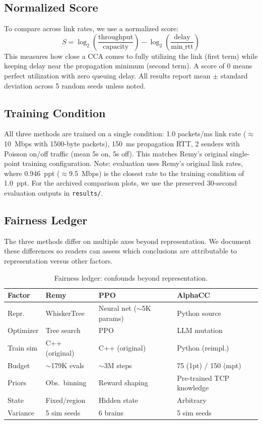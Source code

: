 \subsection{Normalized Score}

To compare across link rates, we use a normalized score:
\begin{equation}
S = \log_2\!\left(\frac{\text{throughput}}{\text{capacity}}\right) - \log_2\!\left(\frac{\text{delay}}{\text{min\_rtt}}\right)
\end{equation}
This measures how close a CCA comes to fully utilizing the link (first term)
while keeping delay near the propagation minimum (second term). A score of 0
means perfect utilization with zero queuing delay. All results report
mean $\pm$ standard deviation across 5 random seeds unless noted.

\subsection{Training Condition}

All three methods are trained on a single condition: 1.0 packets/ms link rate
(${\approx}$10~Mbps with 1500-byte packets), 150~ms propagation RTT, 2
senders with Poisson on/off traffic (mean 5s on, 5s off). This matches Remy's
original single-point training configuration. Note: evaluation uses Remy's
original link rates, where 0.946~ppt ($\approx$9.5~Mbps) is the closest
rate to the training condition of 1.0~ppt. For the archived comparison plots,
we use the preserved 30-second evaluation outputs in \texttt{results/}.

\subsection{Fairness Ledger}

The three methods differ on multiple axes beyond representation. We document
these differences so readers can assess which conclusions are attributable to
representation versus other factors.

\begin{table}[t]
\centering
\caption{Fairness ledger: confounds beyond representation.}
\label{tab:fairness}
\small
\begin{tabular}{@{}p{1.6cm}p{1.8cm}p{1.8cm}p{1.8cm}@{}}
\toprule
Factor & Remy & PPO & AlphaCC \\
\midrule
Repr.     & WhiskerTree & Neural net (${\sim}$5K params) & Python source \\
Optimizer & Tree search & PPO & LLM mutation \\
Train sim & C++ (original) & C++ (original) & Python (reimpl.) \\
Budget    & ${\sim}$179K evals & ${\sim}$3M steps & 75 (1pt) / 150 (mpt) \\
Priors    & Obs.\ binning & Reward shaping & Pre-trained TCP knowledge \\
State     & Fixed/region & Hidden state & Arbitrary \\
Variance  & 5 sim seeds & 6 brains & 5 sim seeds \\
\bottomrule
\end{tabular}
\end{table}

